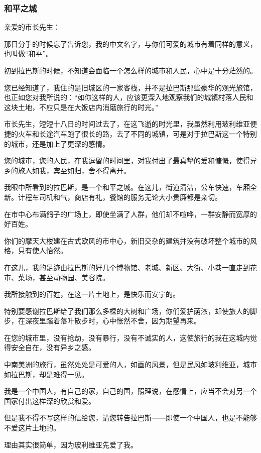 \subsubsection*{和平之城}
\par 亲爱的市长先生：
\par 那日分手的时候忘了告诉您，我的中文名字，与你们可爱的城市有着同样的意义，也叫做“和平”。
\par 初到拉巴斯的时候，不知道会面临一个怎么样的城市和人民，心中是十分茫然的。
\par 您已经知道了，我住的是旧城区的一家客栈，并不是拉巴斯那些豪华的观光旅馆，也正如您对我所说的：“如你这样的人，应该更深入地观察我们的城镇村落人民和这块土地，不应只是在大饭店内消磨旅行的时光。”
\par 市长先生，短短十八日的时间过去了，在这飞逝的时光里，我虽然利用玻利维亚便捷的火车和长途汽车跑了很长的路，去了不同的城镇，可是对于拉巴斯这一个特别的城市，还是加上了更深的感情。
\par 您的城市，您的人民，在我逗留的时间里，对我付出了最真挚的爱和慷慨，使得异乡的旅人如我，宾至如归，舍不得离开。
\par 我眼中所看到的拉巴斯，是一个和平之城。在这儿，街道清洁，公车快速，车厢全新。计程车司机和气，商店有礼，餐馆的服务无论大小贵廉都是亲切。
\par 在市中心布满鸽子的广场上，即使坐满了人群，他们却不喧哗，一群安静而宽厚的好百姓。
\par 你们的摩天大楼建在古式欧风的市中心，新旧交杂的建筑并没有破坏整个城市的风格，只有使人怡然。
\par 在这儿，我的足迹由拉巴斯的好几个博物馆、老城、新区、大街、小巷一直走到花市、菜场，甚至动物园、美容院。
\par 我所接触到的百姓，在这一片土地上，是快乐而安宁的。
\par 特别要感谢拉巴斯给了我们那么多棵的大树和广场，你们爱护荫浓，却使旅人的脚步，在深夜里踏着落叶散步时，心中怅然不舍，因为期望再来。
\par 在您的城市里，没有抢劫，没有暴行，没有不诚实的人，这使旅行的我在这城内觉得安全自在，没有异乡之感。
\par 中南美洲的旅行，虽然处处是可爱的人，如画的风景，但是民风如玻利维亚，城市如拉巴斯，却是难得一见。
\par 我是一个中国人，有自己的家，自己的国，照理说，在感情上，应当不会对另一个国家付出这样深的欣赏和爱。
\par 但是我不得不写这样的信给您，请您转告拉巴斯——即使一个中国人，也是不能够不爱这片土地的。
\par 理由其实很简单，因为玻利维亚先爱了我。

